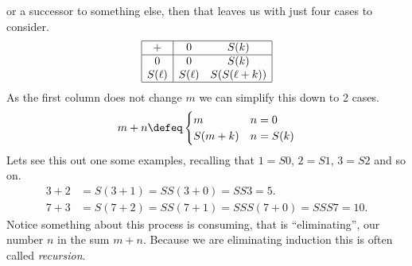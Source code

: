 or a successor to something else, then that leaves us with just four cases 
to consider.
\begin{align*}
    \begin{array}{|c|cc|}
        \hline 
        + & 0 & S(k)\\
        \hline 
        0 & 0 & S(k) \\
        S(\ell) & S(\ell) & S(S(\ell+k))\\
        \hline
    \end{array}
\end{align*}
As the first column does not change $m$ we can simplify this down to 2 cases.
\begin{align*}
    m+n \defeq \begin{cases} m & n=0\\ S(m+k) & n=S(k)\end{cases}
\end{align*}
Lets see this out one some examples, recalling that $1=S0$, $2=S1$, $3=S2$ and so on.
\begin{align*}
    3+2 & = S(3+1)= SS(3+0) = SS3=5.\\
    7+3 & = S(7+2) = SS(7+1) = SSS(7+0)=SSS7=10.
\end{align*}
Notice something about this process is consuming, that is ``eliminating'',
our number $n$ in the sum $m+n$.  Because we are eliminating induction this 
is often called \emph{recursion}.


